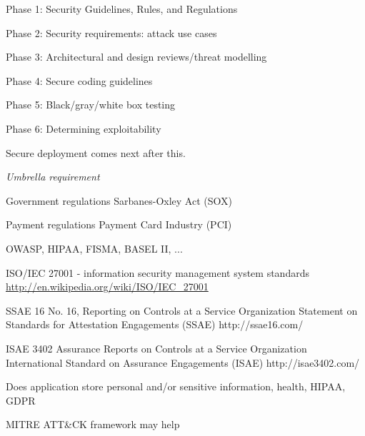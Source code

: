 \documentclass[Screen16to9,17pt]{foils}
\begin{document}

\begin{list2}
\item Phase 1: Security Guidelines, Rules, and Regulations
\item Phase 2: Security requirements: attack use cases
\item Phase 3: Architectural and design reviews/threat modelling
\item Phase 4: Secure coding guidelines
\item Phase 5: Black/gray/white box testing
\item Phase 6: Determining exploitability
\end{list2}

Secure deployment comes next after this.


\begin{list2}
\item \emph{Umbrella requirement}
\item Government regulations Sarbanes-Oxley Act (SOX)
\item Payment regulations Payment Card Industry (PCI)
\item OWASP, HIPAA, FISMA, BASEL II, ...
\item ISO/IEC 27001 - information security management system standards
\url{http://en.wikipedia.org/wiki/ISO/IEC_27001}
\item SSAE 16 No. 16, Reporting on Controls at a Service Organization
Statement on Standards for Attestation Engagements (SSAE) http://ssae16.com/
\item ISAE 3402 Assurance Reports on Controls at a Service Organization
International Standard on Assurance Engagements (ISAE) http://isae3402.com/
\end{list2}






\begin{list2}
\item Does application store personal and/or sensitive information, health, HIPAA, GDPR
\item MITRE ATT\&CK framework may help 
\end{list2}

\end{document}

